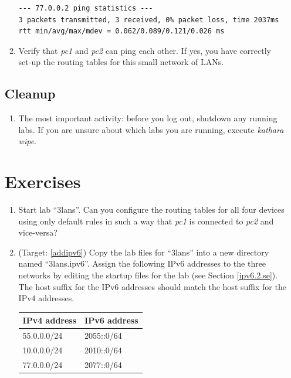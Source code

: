 \documentclass[12pt]{book}
\begin{document}
\begin{enumerate}[label=\arabic*.]
\begin{enumerate}[resume*]
\begin{lstlisting}
--- 77.0.0.2 ping statistics ---
3 packets transmitted, 3 received, 0% packet loss, time 2037ms
rtt min/avg/max/mdev = 0.062/0.089/0.121/0.026 ms
  \end{lstlisting}

  \item Verify that \emph{pc1} and \emph{pc2} can ping each other. If yes, you have correctly set-up the routing tables for this small network of LANs.
\end{enumerate}

\subsection{Cleanup}

\begin{enumerate}[resume*]
\item The most important activity: before you log out, shutdown any running labs. If you are unsure about which labs you are running, execute \emph{kathara wipe}.
\end{enumerate}


\section{Exercises}

\begin{enumerate}[label=\arabic*.]
\item Start lab ``3lans''. Can you configure the routing tables for all four devices  using only default rules in such a way that \emph{pc1} is connected to \emph{pc2} and vice-versa?

\item\label{ipv6.3.ex} (Target: \ref{addipv6}) Copy the lab files for ``3lans'' into a new directory named ``3lans.ipv6''. Assign the following IPv6 addresses to the three networks by editing the startup files for the lab (see Section \ref{ipv6.2.se}). The host suffix for the IPv6 addresses should match the host suffix for the IPv4 addresses.

  \begin{tabular}{l l} \toprule
    IPv4 address  & IPv6 address \\ \midrule
    55.0.0.0/24 & 2055::0/64 \\
    10.0.0.0/24 & 2010::0/64 \\
    77.0.0.0/24 & 2077::0/64\\ \bottomrule
  \end{tabular}


\end{enumerate}
\end{enumerate}
\end{document}
